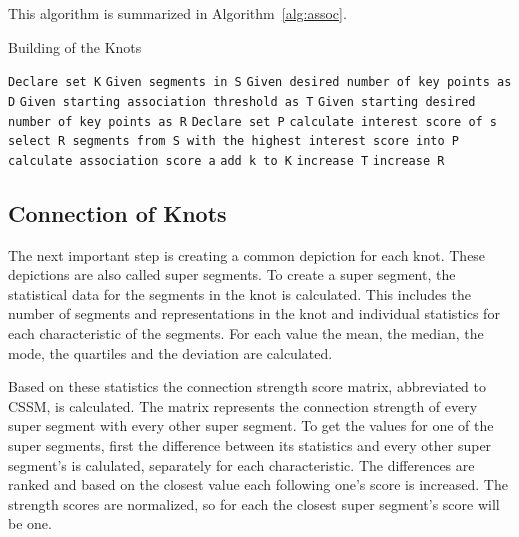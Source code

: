This algorithm is summarized in Algorithm~\ref{alg:assoc}.

\begin{algorithm}[H]
\caption{Building of the Knots}\label{alg:assoc}
\begin{algorithmic}
\State \texttt{Declare set K}
\State \texttt{Given segments in S}
\State \texttt{Given desired number of key points as D}
\State \texttt{Given starting association threshold as T}
\State \texttt{Given starting desired number of key points as R}
    \State \texttt{Declare set P}
        \State \texttt{calculate interest score of s}
    \EndFor
    \State \texttt{select R segments from S with the highest interest score into P}
            \State \texttt{calculate association score a}
            \EndIf
        \EndFor
        \State \texttt{add k to K}
    \EndFor
    \State \texttt{increase T}
    \State \texttt{increase R}
\EndWhile
\end{algorithmic}
\end{algorithm}

\subsection{Connection of Knots} %
\label{subsec:connect_knots}

The next important step is creating a common depiction for each knot. These depictions are also called super segments. To create a super segment, the statistical data for the segments in the knot is calculated. This includes the number of segments and representations in the knot and individual statistics for each characteristic of the segments. For each value the mean, the median, the mode, the quartiles and the deviation are calculated.

Based on these statistics the connection strength score matrix, abbreviated to CSSM, is calculated. The matrix represents the connection strength of every super segment with every other super segment. To get the values for one of the super segments, first the difference between its statistics and every other super segment's is calulated, separately for each characteristic. The differences are ranked and based on the closest value each following one's score is increased. The strength scores are normalized, so for each the closest super segment's score will be one.

